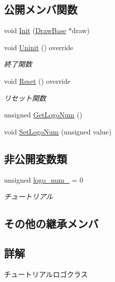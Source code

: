 \subsection*{公開メンバ関数}
\begin{DoxyCompactItemize}
\item 
void \mbox{\hyperlink{class_tutorial_logo_a590f017a6b0532d08c1377b90b8fba3f}{Init}} (\mbox{\hyperlink{class_draw_base}{Draw\+Base}} $\ast$draw)
\item 
void \mbox{\hyperlink{class_tutorial_logo_a8e1f1dba47dadf7d1bb40f616324ffb5}{Uninit}} () override
\begin{DoxyCompactList}\small\item\em 終了関数 \end{DoxyCompactList}\item 
void \mbox{\hyperlink{class_tutorial_logo_a2c9e22c81cfeafbd34f50cc766a66cf1}{Reset}} () override
\begin{DoxyCompactList}\small\item\em リセット関数 \end{DoxyCompactList}\item 
unsigned \mbox{\hyperlink{class_tutorial_logo_af4735bb34e06803ff13ae227fcf74e09}{Get\+Logo\+Num}} ()
\item 
void \mbox{\hyperlink{class_tutorial_logo_a18313074bc7242f5e8a9121414abd51d}{Set\+Logo\+Num}} (unsigned value)
\end{DoxyCompactItemize}
\subsection*{非公開変数類}
\begin{DoxyCompactItemize}
\item 
unsigned \mbox{\hyperlink{class_tutorial_logo_a8027b42e33a036e88277c4cd17fabdaa}{logo\+\_\+num\+\_\+}} = 0
\begin{DoxyCompactList}\small\item\em チュートリアル \end{DoxyCompactList}\end{DoxyCompactItemize}
\subsection*{その他の継承メンバ}


\subsection{詳解}
チュートリアルロゴクラス 

